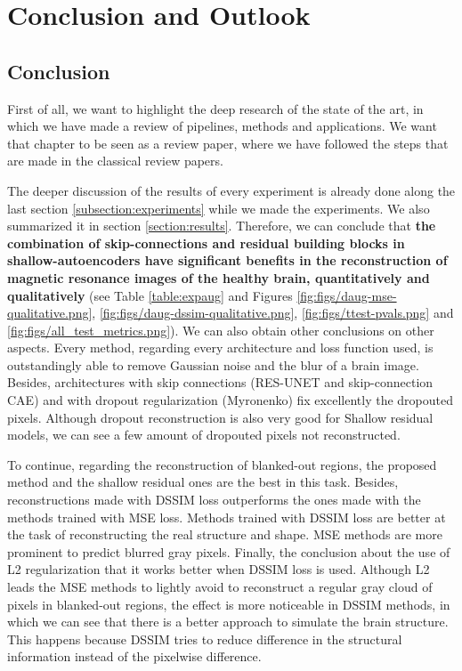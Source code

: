 \chapter{Conclusion and Outlook}
\label{chapter:Conclusion}

\section{Conclusion}

First of all, we want to highlight the deep research of the state of the art, in which we have made a review of pipelines, methods and applications. We want that chapter to be seen as a review paper, where we have followed the steps that are made in the classical review papers.

The deeper discussion of the results of every experiment is already done along the last section \ref{subsection:experiments} while we made the experiments. We also summarized it in section \ref{section:results}. Therefore, we can conclude that \textbf{the combination of skip-connections and residual building blocks in shallow-autoencoders have significant benefits in the reconstruction of magnetic resonance images of the healthy brain, quantitatively and qualitatively} (see Table \ref{table:expaug} and Figures \ref{fig:figs/daug-mse-qualitative.png}, \ref{fig:figs/daug-dssim-qualitative.png}, \ref{fig:figs/ttest-pvals.png} and \ref{fig:figs/all_test_metrics.png}). We can also obtain other conclusions on other aspects. Every method, regarding every architecture and loss function used, is outstandingly able to remove Gaussian noise and the blur of a brain image. Besides, architectures with skip connections (RES-UNET and skip-connection CAE) and with dropout regularization (Myronenko) fix excellently the dropouted pixels. Although dropout reconstruction is also very good for Shallow residual models, we can see a few amount of dropouted pixels not reconstructed. 

To continue, regarding the reconstruction of blanked-out regions, the proposed method and the shallow residual ones are the best in this task. Besides, reconstructions made with DSSIM loss outperforms the ones made with the methods trained with MSE loss. Methods trained with DSSIM loss are better at the task of reconstructing the real structure and shape. MSE methods are more prominent to predict blurred gray pixels. Finally, the conclusion about the use of L2 regularization that it works better when DSSIM loss is used. Although L2 leads the MSE methods to lightly avoid to reconstruct a regular gray cloud of pixels in blanked-out regions, the effect is more noticeable in DSSIM methods, in which we can see that there is a better approach to simulate the brain structure. This happens because DSSIM tries to reduce difference in the structural information instead of the pixelwise difference.

